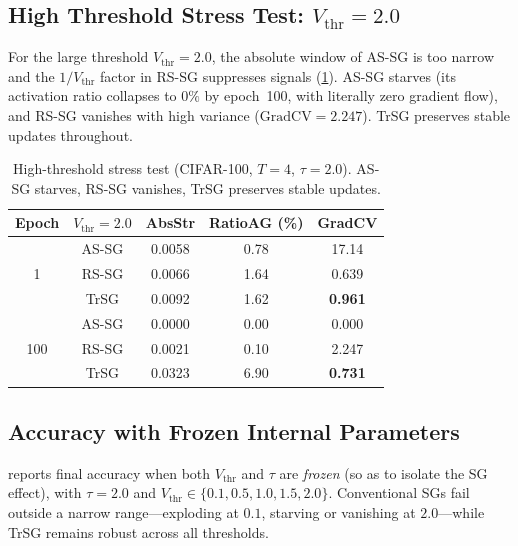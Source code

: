 \subsection{High Threshold Stress Test: $V_{\text{thr}}=2.0$}
\label{subsec:exp_trsg_metric_high}

For the large threshold $V_{\text{thr}}=2.0$, the absolute window of AS-SG is too narrow and the $1/V_{\text{thr}}$ factor in RS-SG suppresses signals (\cref{tab:metrics_high}). AS-SG starves (its activation ratio collapses to $0\%$ by epoch~100, with literally zero gradient flow), and RS-SG vanishes with high variance ($\mathrm{GradCV}=2.247$). TrSG preserves stable updates throughout.

\begin{table}[h]
\centering
\small
\begin{tabular}{ccccc}
\toprule
\textbf{Epoch} & $V_{\text{thr}}{=}2.0$ & \textbf{AbsStr} & \textbf{RatioAG (\%)} & \textbf{GradCV} \\
\midrule
\multirow{3}{*}{1} & AS-SG & 0.0058 & 0.78 & 17.14 \\
                   & RS-SG & 0.0066 & 1.64 & 0.639 \\
                   & TrSG  & 0.0092 & 1.62 & \textbf{0.961} \\
\midrule
\multirow{3}{*}{100} & AS-SG & 0.0000 & 0.00 & 0.000 \\
                     & RS-SG & 0.0021 & 0.10 & 2.247 \\
                     & TrSG  & 0.0323 & 6.90 & \textbf{0.731} \\
\bottomrule
\end{tabular}
\caption{High-threshold stress test (CIFAR-100, $T=4$, $\tau=2.0$). AS-SG starves, RS-SG vanishes, TrSG preserves stable updates.}
\label{tab:metrics_high}
\end{table}

\subsection{Accuracy with Frozen Internal Parameters}
\label{subsec:exp_no_training}

 reports final accuracy when both $V_{\text{thr}}$ and $\tau$ are \emph{frozen} (so as to isolate the SG effect), with $\tau=2.0$ and $V_{\text{thr}}\in\{0.1,0.5,1.0,1.5,2.0\}$. Conventional SGs fail outside a narrow range—exploding at $0.1$, starving or vanishing at $2.0$—while TrSG remains robust across all thresholds.

